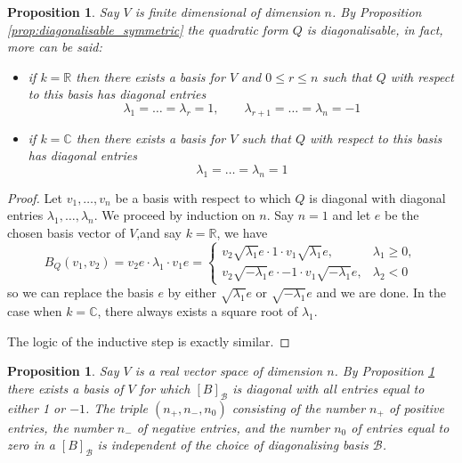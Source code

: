 \documentclass[12pt]{article}
\theoremstyle{plain}
\newtheorem{proposition}[thm]{Proposition}
\theoremstyle{definition}
\newcommand{\bb}[1]{\mathbb{#1}}
\newcommand{\scr}[1]{\mathscr{#1}}
\begin{document}
	\begin{proposition}\label{prop:one_negative_one}
		Say $V$ is finite dimensional of dimension $n$. By Proposition \ref{prop:diagonalisable_symmetric} the quadratic form $Q$ is diagonalisable, in fact, more can be said:
		\begin{itemize}
			\item if $k = \bb{R}$ then there exists a basis for $V$ and $0 \leq r \leq n$ such that $Q$ with respect to this basis has diagonal entries
			\begin{equation}
				\lambda_1 = \hdots = \lambda_r = 1, \qquad \lambda_{r+1} = \hdots = \lambda_n = -1
			\end{equation}
			\item if $k = \bb{C}$ then there exists a basis for $V$ such that $Q$ with respect to this basis has diagonal entries
			\begin{equation}
				\lambda_1 = \hdots = \lambda_n = 1
			\end{equation}
		\end{itemize}
	\end{proposition}
	\begin{proof}
		Let $v_1,\hdots,v_n$ be a basis with respect to which $Q$ is diagonal with diagonal entries $\lambda_1,\hdots,\lambda_n$. We proceed by induction on $n$. Say $n = 1$ and let $e$ be the chosen basis vector of $V$,and say $k = \bb{R}$,  we have
		\begin{equation}
			B_Q(v_1,v_2) = v_2e\cdot \lambda_1 \cdot v_1 e =
			\begin{cases}
				v_2 \sqrt{\lambda_1}e\cdot 1 \cdot v_1\sqrt{\lambda_1} e,&\lambda_1 \geq 0,\\
				v_2 \sqrt{-\lambda_1}e\cdot -1 \cdot v_1\sqrt{-\lambda_1} e,& \lambda_2 < 0
			\end{cases}
		\end{equation}
		so we can replace the basis $e$ by either $\sqrt{\lambda_1}e$ or $\sqrt{-\lambda_1}e$ and we are done. In the case when $k = \bb{C}$, there always exists a square root of $\lambda_1$.
		
		The logic of the inductive step is exactly similar.
	\end{proof}
	\begin{proposition}\label{prop:signature}
		Say $V$ is a real vector space of dimension $n$. By Proposition \ref{prop:one_negative_one} there exists a basis of $V$ for which $[B]_{\scr{B}}$ is diagonal with all entries equal to either 1 or $-1$. The triple $(n_{+},n_{-},n_0)$ consisting of the number $n_{+}$ of positive entries, the number $n_{-}$ of negative entries, and the number $n_{0}$ of entries equal to zero in a $[B]_{\scr{B}}$ is independent of the choice of diagonalising basis $\scr{B}$. 
	\end{proposition}
\end{document}

